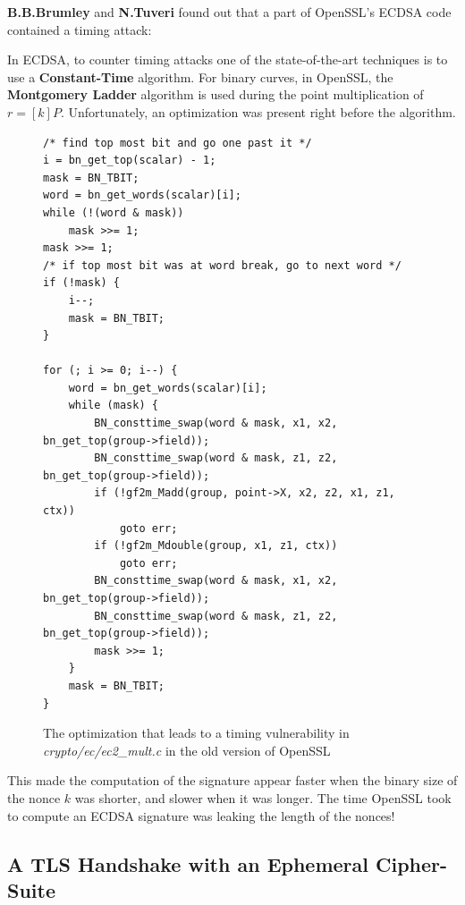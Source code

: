\documentclass[a4paper,11pt]{article}
\begin{document}
\textbf{B.B.Brumley} and \textbf{N.Tuveri} found out\cite{brumley-tuveri} that a part of OpenSSL's ECDSA code contained a timing attack:

In ECDSA, to counter timing attacks one of the state-of-the-art techniques is to use a \textbf{Constant-Time} algorithm. For binary curves, in OpenSSL, the \textbf{Montgomery Ladder} algorithm is used during the point multiplication of $r = [k] P$. Unfortunately, an optimization was present right before the algorithm.

\begin{figure}[H]
\begin{verbatim}
/* find top most bit and go one past it */
i = bn_get_top(scalar) - 1;
mask = BN_TBIT;
word = bn_get_words(scalar)[i];
while (!(word & mask))
    mask >>= 1;
mask >>= 1;
/* if top most bit was at word break, go to next word */
if (!mask) {
    i--;
    mask = BN_TBIT;
}

for (; i >= 0; i--) {
    word = bn_get_words(scalar)[i];
    while (mask) {
        BN_consttime_swap(word & mask, x1, x2, bn_get_top(group->field));
        BN_consttime_swap(word & mask, z1, z2, bn_get_top(group->field));
        if (!gf2m_Madd(group, point->X, x2, z2, x1, z1, ctx))
            goto err;
        if (!gf2m_Mdouble(group, x1, z1, ctx))
            goto err;
        BN_consttime_swap(word & mask, x1, x2, bn_get_top(group->field));
        BN_consttime_swap(word & mask, z1, z2, bn_get_top(group->field));
        mask >>= 1;
    }
    mask = BN_TBIT;
}
\end{verbatim}
\caption{The optimization that leads to a timing vulnerability in \textit{crypto/ec/ec2\_mult.c} in the old version of OpenSSL}
\end{figure}

This made the computation of the signature appear faster when the binary size of the nonce $k$ was shorter, and slower when it was longer. The time OpenSSL took to compute an ECDSA signature was leaking the length of the nonces!

\subsection{A TLS Handshake with an Ephemeral Cipher-Suite}
\end{document}
